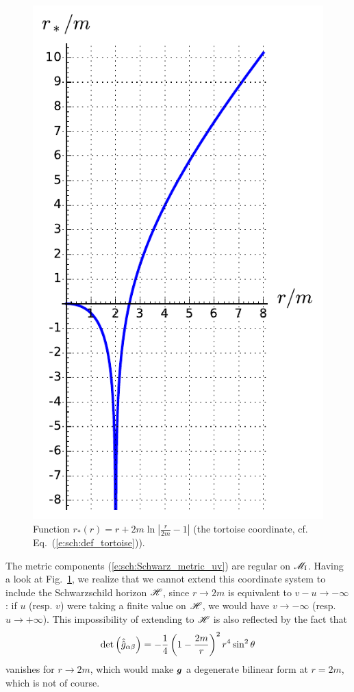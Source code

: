 \begin{figure}
\centerline{\includegraphics[height=0.37\textheight]{sch_tortoise.pdf}}
\caption[]{\label{f:sch:tortoise} \footnotesize
Function $r_*(r) = r + 2 m \ln \left| \frac{r}{2m} - 1 \right|$
(the tortoise coordinate, cf. Eq.~(\ref{e:sch:def_tortoise})).}
\end{figure}

The metric components (\ref{e:sch:Schwarz_metric_uv}) are regular on $\mathscr{M}_{\rm I}$.
Having a look at Fig.~\ref{f:sch:tortoise}, we realize that we cannot extend
this coordinate system to include the Schwarzschild horizon $\mathscr{H}$, since
$r\rightarrow 2m$ is equivalent to $v-u\rightarrow -\infty$: if $u$ (resp. $v$)
were taking a finite value on $\mathscr{H}$, we would have $v\rightarrow -\infty$
(resp. $u\rightarrow +\infty$). This impossibility of extending to $\mathscr{H}$
is also reflected by the fact that
\[
    \det \left( \hat{\hat{g}}_{\alpha\beta} \right) =
        - \frac{1}{4} \left( 1 - \frac{2 m}{r} \right) ^2 r^4 \sin^2\theta
\]
vanishes for $r\rightarrow 2m$, which would make $\bm{g}$ a degenerate bilinear
form at $r=2m$, which is not of course.

